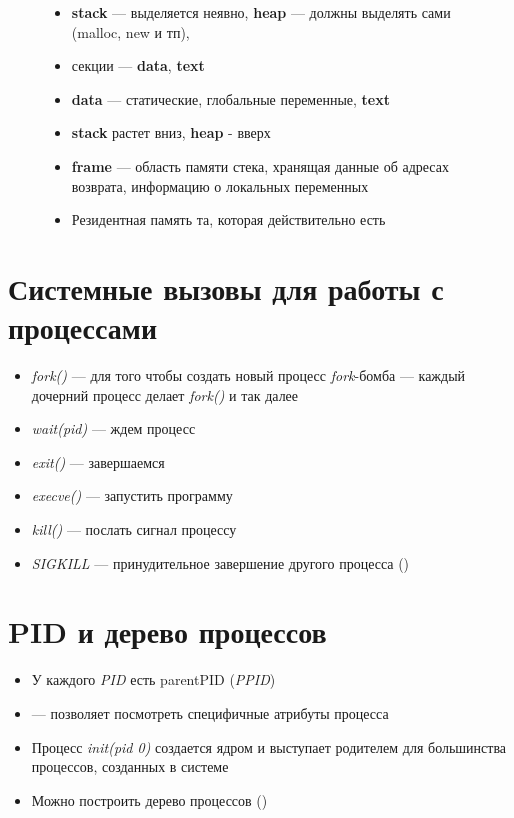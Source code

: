 \documentclass[../../lectures.tex]{subfiles}
\begin{document}
\begin{figure}[H]
\begin{minipage}[c]{0.7\linewidth}
\centering
\begin{itemize}
    \item \textbf{stack} --- выделяется неявно, \textbf{heap} --- должны выделять сами (malloc, new и тп),
    \item секции --- \textbf{data}, \textbf{text}
    \item \textbf{data} --- статические, глобальные переменные, \textbf{text}
    \item \textbf{stack} растет вниз, \textbf{heap} - вверх
    \item \textbf{frame} --- область памяти стека, хранящая данные об адресах возврата, информацию о локальных переменных
    \item Резидентная память та, которая действительно есть
\end{itemize}
\end{minipage}
\end{figure}

\section{Системные вызовы для работы с процессами}
\begin{itemize}
    \item \emph{fork()} --- для того чтобы создать новый процесс
    \emph{fork}-бомба --- каждый дочерний процесс делает \emph{fork()} и так далее
    \item \emph{wait(pid)} --- ждем процесс
    \item \emph{exit()} --- завершаемся
    \newpage
    \item \emph{execve()} --- запустить программу
    \item \emph{kill()} --- послать сигнал процессу
    \item \emph{SIGKILL} --- принудительное завершение другого процесса () 
\end{itemize}

\section{PID и дерево процессов}
\begin{itemize}
    \item У каждого \emph{PID} есть parentPID (\emph{PPID})

    \item {} --- позволяет посмотреть специфичные атрибуты процесса

    \item Процесс \emph{init(pid 0)} создается ядром и выступает родителем для большинства процессов, созданных в системе

    \item Можно построить дерево процессов ()
\end{itemize}
\end{document}
